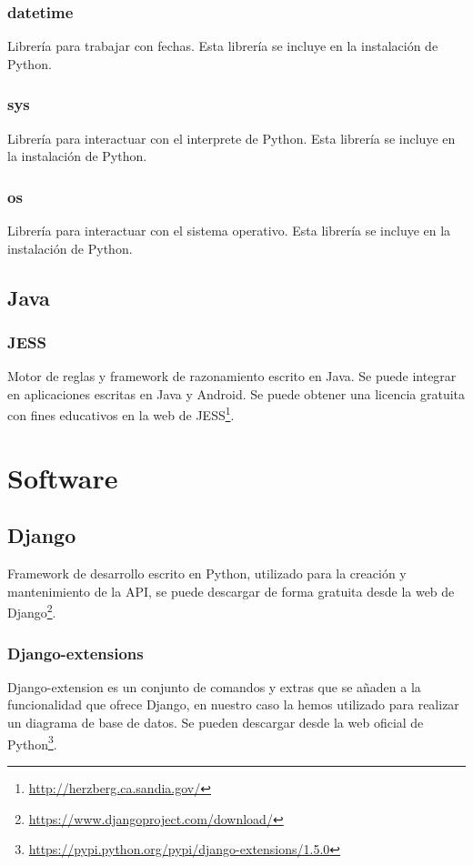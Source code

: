 \subsubsection{datetime}
Librería para trabajar con fechas.
Esta librería se incluye en la instalación de Python.
\subsubsection{sys}
Librería para interactuar con el interprete de Python.
Esta librería se incluye en la instalación de Python.
\subsubsection{os}
Librería para interactuar con el sistema operativo.
Esta librería se incluye en la instalación de Python.

\subsection{Java}
\subsubsection{JESS}
Motor de reglas y framework de razonamiento escrito en Java. Se puede integrar en aplicaciones escritas en Java y Android. Se puede obtener una licencia gratuita con fines educativos en la web de JESS\footnote{\url{http://herzberg.ca.sandia.gov/}}.
\section{Software}
\subsection{Django}
Framework de desarrollo escrito en Python, utilizado para la creación y mantenimiento de la API, se puede descargar de forma gratuita desde la web de Django\footnote{\url{https://www.djangoproject.com/download/}}.
\subsubsection{Django-extensions}
Django-extension es un conjunto de comandos y extras que se añaden a la funcionalidad que ofrece Django, en nuestro caso la hemos utilizado para realizar un diagrama de base de datos. Se pueden descargar desde la web oficial de Python\footnote{\url{https://pypi.python.org/pypi/django-extensions/1.5.0}}.

